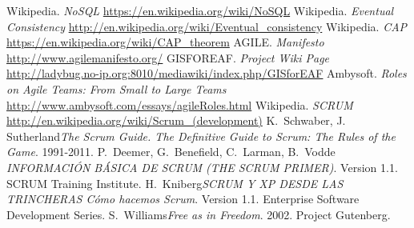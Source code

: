\documentclass[11pt]{article} %
\begin{document}
\begin{thebibliography}{9}
Wikipedia. \emph{NoSQL} \url{https://en.wikipedia.org/wiki/NoSQL}
Wikipedia. \emph{Eventual Consistency} \url{http://en.wikipedia.org/wiki/Eventual_consistency}
Wikipedia. \emph{CAP} \url{https://en.wikipedia.org/wiki/CAP_theorem}
AGILE. \emph{Manifesto} \url{http://www.agilemanifesto.org/}
GISFOREAF. \emph{Project Wiki Page} \url{http://ladybug.no-ip.org:8010/mediawiki/index.php/GISforEAF}
Ambysoft. \emph{Roles on Agile Teams: From Small to Large Teams} \url{http://www.ambysoft.com/essays/agileRoles.html}
Wikipedia. \emph{SCRUM} \url{http://en.wikipedia.org/wiki/Scrum_(development)}
K.\ Schwaber, J. Sutherland{\em The Scrum Guide. The Definitive Guide to Scrum: The Rules of the Game}. 1991-2011.
P.\ Deemer, G.\ Benefield, C.\ Larman, B.\ Vodde {\em INFORMACIÓN BÁSICA DE SCRUM (THE SCRUM PRIMER)}. Version 1.1. SCRUM Training Institute.
H.\ Kniberg{\em SCRUM Y XP DESDE LAS TRINCHERAS Cómo hacemos Scrum}. Version 1.1. Enterprise Software Development Series.
S.\ Williams{\em Free as in Freedom}. 2002. Project Gutenberg.
\end{thebibliography}
\end{document}
